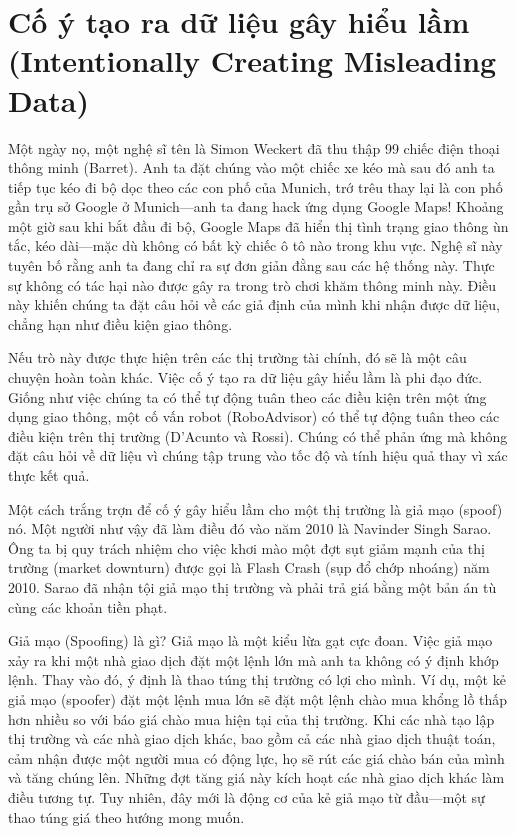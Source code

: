 \section{Cố ý tạo ra dữ liệu gây hiểu lầm (Intentionally Creating Misleading Data)}

Một ngày nọ, một nghệ sĩ tên là Simon Weckert đã thu thập 99 chiếc điện thoại thông minh (Barret). Anh ta đặt chúng vào một chiếc xe kéo mà sau đó anh ta tiếp tục kéo đi bộ dọc theo các con phố của Munich, trớ trêu thay lại là con phố gần trụ sở Google ở Munich---anh ta đang hack ứng dụng Google Maps! Khoảng một giờ sau khi bắt đầu đi bộ, Google Maps đã hiển thị tình trạng giao thông ùn tắc, kéo dài---mặc dù không có bất kỳ chiếc ô tô nào trong khu vực. Nghệ sĩ này tuyên bố rằng anh ta đang chỉ ra sự đơn giản đằng sau các hệ thống này. Thực sự không có tác hại nào được gây ra trong trò chơi khăm thông minh này. Điều này khiến chúng ta đặt câu hỏi về các giả định của mình khi nhận được dữ liệu, chẳng hạn như điều kiện giao thông.

Nếu trò này được thực hiện trên các thị trường tài chính, đó sẽ là một câu chuyện hoàn toàn khác. Việc cố ý tạo ra dữ liệu gây hiểu lầm là phi đạo đức. Giống như việc chúng ta có thể tự động tuân theo các điều kiện trên một ứng dụng giao thông, một cố vấn robot (RoboAdvisor) có thể tự động tuân theo các điều kiện trên thị trường (D'Acunto và Rossi). Chúng có thể phản ứng mà không đặt câu hỏi về dữ liệu vì chúng tập trung vào tốc độ và tính hiệu quả thay vì xác thực kết quả.

Một cách trắng trợn để cố ý gây hiểu lầm cho một thị trường là giả mạo (spoof) nó. Một người như vậy đã làm điều đó vào năm 2010 là Navinder Singh Sarao. Ông ta bị quy trách nhiệm cho việc khơi mào một đợt sụt giảm mạnh của thị trường (market downturn) được gọi là Flash Crash (sụp đổ chớp nhoáng) năm 2010. Sarao đã nhận tội giả mạo thị trường và phải trả giá bằng một bản án tù cùng các khoản tiền phạt.

Giả mạo (Spoofing) là gì? Giả mạo là một kiểu lừa gạt cực đoan. Việc giả mạo xảy ra khi một nhà giao dịch đặt một lệnh lớn mà anh ta không có ý định khớp lệnh. Thay vào đó, ý định là thao túng thị trường có lợi cho mình. Ví dụ, một kẻ giả mạo (spoofer) đặt một lệnh mua lớn sẽ đặt một lệnh chào mua khổng lồ thấp hơn nhiều so với báo giá chào mua hiện tại của thị trường. Khi các nhà tạo lập thị trường và các nhà giao dịch khác, bao gồm cả các nhà giao dịch thuật toán, cảm nhận được một người mua có động lực, họ sẽ rút các giá chào bán của mình và tăng chúng lên. Những đợt tăng giá này kích hoạt các nhà giao dịch khác làm điều tương tự. Tuy nhiên, đây mới là động cơ của kẻ giả mạo từ đầu---một sự thao túng giá theo hướng mong muốn.

